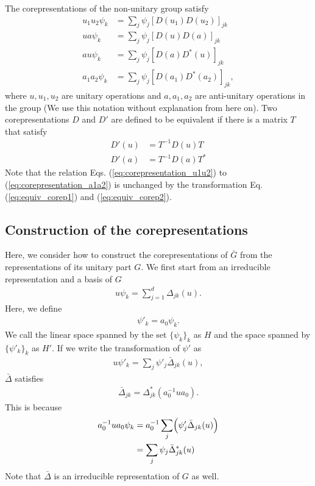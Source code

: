 \documentclass{article}
\begin{document}
The corepresentations of the non-unitary group satisfy
\begin{align}
  u_1 u_2 \psi_k &= \sum_j \psi_j [D(u_1) D(u_2)]_{jk}
  \label{eq:corepresentation_u1u2}
  \\
  u a \psi_k &= \sum_j \psi_j [D(u) D(a)]_{jk}
  \label{eq:corepresentation_ua}
  \\
  au \psi_k &= \sum_j \psi_j [D(a) D^*(u)]_{jk}
  \label{eq:corepresentation_au}
  \\
  a_1 a_2 \psi_k &= \sum_j \psi_j [D(a_1) D^*(a_2)]_{jk},
  \label{eq:corepresentation_a1a2}
\end{align}
where $u, u_1, u_2$ are unitary operations and $a, a_1, a_2$ are anti-unitary operations in the group (We use this notation without explanation from here on).
Two corepresentations $D$ and $D'$ are defined to be equivalent if there is a matrix $T$ that satisfy
\begin{align}
  D'(u) &= T^{-1} D(u) T
  \label{eq:equiv_corep1}
  \\
  D'(a) &= T^{-1} D(a) T^*
  \label{eq:equiv_corep2}
\end{align}
Note that the relation Eqs. (\ref{eq:corepresentation_u1u2}) to (\ref{eq:corepresentation_a1a2}) is unchanged by the transformation Eq. (\ref{eq:equiv_corep1}) and (\ref{eq:equiv_corep2}).

\subsection{Construction of the corepresentations}
Here, we consider how to construct the corepresentations of $\bar{G}$ from the representations of its unitary part $G$.
We first start from an irreducible representation and a basis of $G$
\begin{align}
  u \psi_k = \sum_{j = 1}^d \Delta_{jk}(u).
\end{align}
Here, we define 
\begin{align}
  \psi'_k = a_0 \psi_k.
\end{align}
We call the linear space spanned by the set $\{\psi_k\}_k$ as $H$ and the space spanned by $\{\psi'_k\}_k$ as $H'$.
If we write the transformation of $\psi'$ as
\begin{align}
  u \psi'_k = \sum_j \psi'_j \bar{\Delta}_{jk}(u),
\end{align}
$\bar{\Delta}$ satisfies
\begin{align}
  \bar{\Delta}_{jk} = \Delta^*_{jk} (a_0^{-1} u a_0).
\end{align}
This is because
\begin{align}
  a_0^{-1} u a_0 \psi_k 
  &= 
  a_0^{-1}
  \sum_j
  \Bigl(
    \psi'_j \bar{\Delta}_{jk}(u)  
  \Bigr)
  \nonumber
  \\&=
  \sum_j \psi_j \bar{\Delta}^*_{jk}(u)  
\end{align}
Note that $\bar{\Delta}$ is an irreducible representation of $G$ as well.
\end{document}
